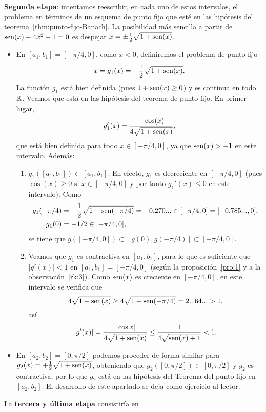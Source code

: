 \begin{example}
  \textbf{Segunda etapa}: intentamos reescribir, en cada uno de
  estos intervalos, el problema en términos de un esquema de punto
  fijo que esté en las hipótesis del teorema~\ref{thm:punto-fijo-Banach}. La
  posibilidad más sencilla a partir de $\operatorname{sen}(x)-4x^2+1=0$ es despejar
  $x=\pm \frac 12 \sqrt{1+\operatorname{sen}(x)}$.
  \begin{itemize}
  \item En $[a_1,b_1]=[-\pi/4, 0]$, como $x<0$, definiremos el
    problema de punto fijo
  $$
  x=g_1(x)=-\dfrac 12 \sqrt{1+\operatorname{sen}(x)}.
  $$
  La función $g_1$ está bien definida (pues $1+\operatorname{sen}(x)\ge 0$) y es
  continua en todo $\operatorname{{\mathbb R}}$. Veamos que está en las hipótesis del
  teorema de punto fijo. En primer lugar,
  $$
  g_1'(x)=\frac{-\cos(x)}{4\sqrt{1+\operatorname{sen}(x)}},
  $$
  que está bien definida para todo $x\in[-\pi/4, 0]$, ya que
  $\operatorname{sen}(x)>-1$ en este intervalo. Además:
  \begin{enumerate}
  \item $g_1([a_1,b_1])\subset [a_1,b_1]$: En efecto, $g_1$ es
    decreciente en $[-\pi/4,0]$ (pues $\cos(x)\ge 0$ si $x\in
    [-\pi/4, 0]$ y por tanto $g_1'(x)\le 0$ en este intervalo). 
    Como
    \begin{align*}
      g_1(-\pi/4)&= -\frac12 \sqrt{1+\operatorname{sen}(-\pi/4)}=-0.270...\in
      [-\pi/4,0]=[-0.785...,0],
      \\
      g_1(0)&=-1/2 \in [-\pi/4,0], 
    \end{align*}
    se tiene que $g([-\pi/4,0])\subset
    [g(0),g(-\pi/4)] \subset [-\pi/4,0]$.
  \item Veamos que $g_1$ es contractiva en $[a_1,b_1]$, para lo que es
    suficiente que $|g'(x)|<1$ en $[a_1,b_1]=[-\pi/4,0]$ (según la
    proposición~\ref{pro:1} y a la observación~\ref{rk:3}).  Como
    $\operatorname{sen}(x)$ es creciente en $[-\pi/4,0]$, en este intervalo se
    verifica que
    $$4\sqrt{1+\operatorname{sen}(x)}\ge 4\sqrt{1+\operatorname{sen}(-\pi/4)}=2.164... >1,$$ 
    así
    $$
    \left|g'(x)\right| = \frac{|\cos{x}|}{4\sqrt{1+\operatorname{sen}(x)}} \le
    \frac{1}{4\sqrt{\operatorname{sen}(x)+1}} < 1.
    $$
  \end{enumerate}
\item En $[a_2,b_2]=[0,\pi/2]$ podemos proceder de forma similar para
  $g_2(x)=+\frac 12 \sqrt{1+\operatorname{sen}(x)}$, obteniendo que
  $g_2([0,\pi/2])\subset[0,\pi/2]$ y $g_2$ es contractiva, por lo que
  $g_2$ está en las hipótesis del Teorema del punto fijo en
  $[a_2,b_2]$. El desarrollo de este apartado se deja como ejercicio
  al lector.
  \end{itemize}
  La \textbf{tercera y última etapa} consistiría en

\end{example}
